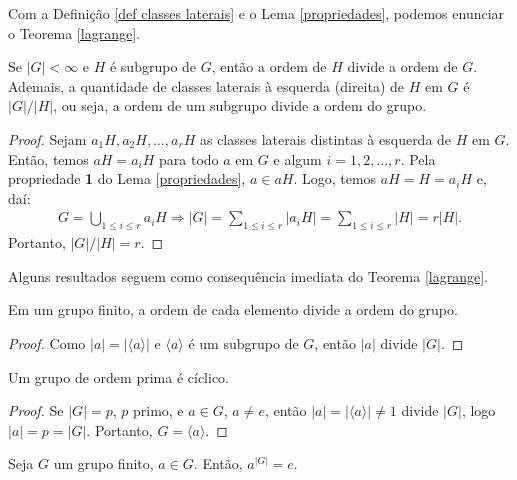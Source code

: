 	Com a Definição \ref{def classes laterais} e o 
	Lema \ref{propriedades}, podemos enunciar o Teorema \ref{lagrange}.
	\begin{theorem}
	\label{lagrange}
		Se $|G|<\infty$ e $H$ é subgrupo de $G$, então a ordem de $H$ divide 
		a ordem de $G$. Ademais, a quantidade de classes laterais à esquerda
		(direita) de $H$ em $G$ é $|G|/|H|$, ou seja, a ordem de um subgrupo
		divide a ordem do grupo. 
	\end{theorem}
	\begin{proof}
		Sejam $a_1H, a_2H, \dots , a_rH$ as classes laterais distintas à
		esquerda de $H$ em $G$. Então, temos $aH = a_iH$ para todo $a$ em 
		$G$ e algum $i = 1,2,\dots,r$. Pela propriedade \textbf{1} do 
		Lema \ref{propriedades}, $a\in aH$. Logo, temos $aH = H = a_iH$ 
		e, daí:
		\begin{align*}
		    G = \bigcup_{1\leq i\leq r}^{}a_iH \Rightarrow |G| 
		    = \sum_{1\leq i\leq r}^{}|a_iH| = \sum_{1\leq i\leq r}|H| 
		    = r|H|.
		\end{align*} 
		Portanto, $|G|/|H| = r$.
	\end{proof}
	Alguns resultados seguem como consequência imediata 
	do Teorema \ref{lagrange}.
	\begin{corollary}
	\label{c2}
		Em um grupo finito, a ordem de cada elemento divide a ordem do grupo.
	\end{corollary}
	\begin{proof}
		Como $|a| = |\langle a\rangle|$ e $\langle a \rangle$ é um subgrupo 
		de $G$, então $|a|$ divide $|G|$. 
	\end{proof}
	\begin{corollary}
	\label{c3}
		Um grupo de ordem prima é cíclico.
	\end{corollary}
	\begin{proof}
		Se $|G| = p$, $p$ primo, e $a\in G$, $a\neq e$, então 
		$|a| = |\langle a\rangle | \neq 1$ divide $|G|$, logo 
		$|a| = p = |G|$. Portanto, $G = \langle a\rangle$. 
	\end{proof}
	\begin{corollary}
	\label{c4}
		Seja $G$ um grupo finito, $a\in G$. Então, $a^{|G|} = e.$
	\end{corollary}
	
